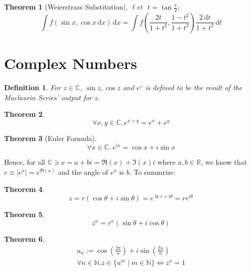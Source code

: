 \documentclass[]{article}
\newtheorem{theorem}{Theorem}[section]
\newtheorem{definition}{Definition}[section]
\newcommand\N     {\mathbb{N}}
\newcommand\R     {\mathbb{R}}
\newcommand\C     {\mathbb{C}}
\newcommand\set   {\ell et \text{ }}
\newcommand\cosx  {\cos x}
\newcommand\sinx  {\sin x}
\newcommand\dx    {\,\mathrm{d}x}
\newcommand\dt    {\,\mathrm{d}t}
\newcommand\cl [1]    {\left ( #1 \right )}
\begin{document}
\begin{multicols}{2}
		\begin{theorem}[Weierstrass Substitution]
			$\set t = \tan \frac{x}{2}$;
			\[ \int f(\sinx, \cosx \dx)\dx =\!\! \int f \cl{\frac{2t}{1 + t^2}, \frac{1 - t^2}{1 + t^2}}\frac{2\dt}{1 + t^2}\dt \]
		\end{theorem}
		
		
		\section{Complex Numbers}
		
		\begin{definition}
			For $z \in \C$, $\sin z, \cos z$ and $e^z$ is defined to be the result of the Maclaurin Series' output for $z$. 
		\end{definition}
		
		\begin{theorem}
			\[\forall x, y \in \C, e^{x + y} = e^x + e^y\]
		\end{theorem}
		
		\begin{theorem}[Euler Formula]
			\[ \forall x \in \C. \ e^{ix} = \cosx + i\sinx \]
		\end{theorem}
		
		Hence, for all $\C \ni x = a + bi = \Re(x) + \Im(x)i$ where $a, b \in \R$, we know that $r \equiv |e^x| = e^{\Re(x)}$ and the angle of $e^x$ is $b$. To summrize: 
		
		\begin{theorem}
			\[ z = r(\cos\theta + i\sin\theta) = e^{\ln r + i\theta} = re^{i\theta} \]
		\end{theorem}
		
		\begin{theorem}
			\[ z^n = r^n(\sin\theta + i\cos\theta) \]
		\end{theorem}
		
		\begin{theorem}
			\begin{gather*}
				u_n := \cos\cl{\frac{2\pi}{n}} + i\sin\cl{\frac{2n}{n}} \\ \forall n \in \N. z \in \{u^{m} \mid m \in \N\} \iff z^n = 1
			\end{gather*}
		\end{theorem}
		
	\end{multicols}
	
	\dotfill
	{\let\newpage\relax\maketitle}
\end{document}
